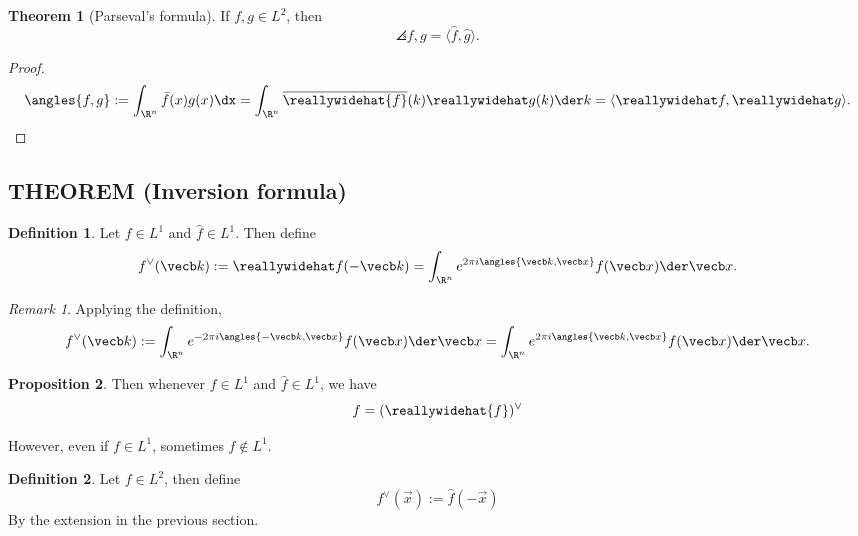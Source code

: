 \documentclass[a5paper]{article}
\theoremstyle{definition}%
\newtheorem{theorem}{Theorem}
\newtheorem{proposition}[theorem]{Proposition}
\newtheorem*{definition*}{Definition}
\numberwithin{exercise}{section}
\theoremstyle{remark}%
\newtheorem*{remark*}{Remark}
\renewcommand{\L}{L}
\begin{document}
\begin{highlight}
\begin{theorem}[Parseval's formula]
If $f,g\in \L^2$, then 
\begin{equation}
\angles{f,g}=\langle{\hat{f},\hat{g}}\rangle.\tag{$2$}
\end{equation}
\end{theorem}
\end{highlight}
\begin{proof}
$$\angles{f,g}:=\int_{\R^n}\bar{f}(x)g(x)\dx = \int_{\R^n} \overline{\reallywidehat{f}}(k)\hat{g}(k)\der k = \langle{\hat{f},\hat{g}}\rangle.$$
\end{proof}

\setcounter{subsection}{4}
\subsection{THEOREM (Inversion formula)}

\begin{highlight}
\begin{definition*}
Let $f\in L^1$ and $\hat{f}\in L^1$. Then define 
\begin{equation}
f^{\vee}(\vec{k}) := \hat{f}(-\vec k)= \int_{\R^n} e^{2\pi i \angles{\vec k,\vec x}} f(\vec x)\der \vec x.
\end{equation}
\end{definition*}
\end{highlight}

\begin{remark*}
Applying the definition, 
$$f^\vee(\vec k):=\int_{\R^n} e^{-2\pi i \angles{-\vec k,\vec x}} f(\vec x)\der \vec x = \int_{\R^n} e^{2\pi i \angles{\vec k,\vec x}} f(\vec x)\der \vec x.$$
\end{remark*}

\begin{highlight}
\begin{proposition}
Then whenever $f\in L^1$ and $\hat{f}\in L^1$, we have 
\begin{equation}
f=(\reallywidehat{f})^\vee
\end{equation}
\end{proposition}
\end{highlight}

However, even if $f\in L^1$, sometimes $\hat{f}\not\in L^1$. 

\begin{highlight}
\begin{definition*}
Let $f\in L^2$, then define 
\begin{equation}
f^{\vee}(\vec{x}) := \hat{f}(-\vec x)\tag{$1$}
\end{equation}
By the extension in the previous section. 
\end{definition*}
\end{highlight}
\end{document}
